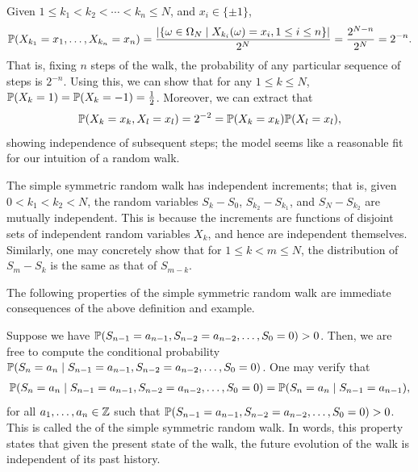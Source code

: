 Given $1 \leq k_{1} < k_{2} < \cdots < k_{n} \leq N$, and $x_{i} \in \{\pm 1\}$,
\begin{align}
    \mathbb{P}(X_{k_{1}} = x_{1}, \ldots, X_{k_{n}} = x_{n}) = \frac{\left| \{\omega \in \Omega_{N} \mid X_{k_{i}}(\omega) = x_{i}, 1 \leq i \leq n\} \right|}{2^{N}} = \frac{2^{N-n}}{2^{N}} = 2^{-n}.
\end{align}
That is, fixing $n$ steps of the walk, the probability of any particular sequence of steps is $2^{-n}$. Using this, we can show that for any $1 \leq k \leq N$, $\mathbb{P}(X_{k} = 1) = \mathbb{P}(X_{k} = -1) = \frac{1}{2}$. Moreover, we can extract that
\begin{align}
    \mathbb{P}(X_{k}=x_{k},X_{l}=x_{l}) = 2^{-2} = \mathbb{P}(X_{k}=x_{k})\mathbb{P}(X_{l}=x_{l}),
\end{align}
showing independence of subsequent steps; the model seems like a reasonable fit for our intuition of a random walk.

\begin{example}
    The simple symmetric random walk has independent increments; that is, given $0 < k_{1} < k_{2} < N$, the random variables $S_{k}-S_{0}$, $S_{k_{2}}-S_{k_{1}}$, and $S_{N}-S_{k_{2}}$ are mutually independent. This is because the increments are functions of disjoint sets of independent random variables $X_{k}$, and hence are independent themselves. Similarly, one may concretely show that for $1 \leq k < m \leq N$, the distribution of $S_{m}-S_{k}$ is the same as that of $S_{m-k}$.
\end{example}

The following properties of the simple symmetric random walk are immediate consequences of the above definition and example.

Suppose we have $\mathbb{P}(S_{n-1}=a_{n-1}, S_{n-2}=a_{n-2}, \ldots, S_{0}=0) > 0$. Then, we are free to compute the conditional probability $\mathbb{P}(S_{n}=a_{n} \mid S_{n-1}=a_{n-1}, S_{n-2}=a_{n-2}, \ldots, S_{0}=0)$. One may verify that
\begin{align}
    \mathbb{P}(S_{n}=a_{n} \mid S_{n-1}=a_{n-1}, S_{n-2}=a_{n-2}, \ldots, S_{0}=0) = \mathbb{P}(S_{n}=a_{n} \mid S_{n-1}=a_{n-1}),
\end{align}
for all $a_{1},\ldots,a_{n} \in \mathbb{Z}$ such that $\mathbb{P}(S_{n-1}=a_{n-1}, S_{n-2}=a_{n-2}, \ldots, S_{0}=0) > 0$. This is called the  of the simple symmetric random walk. In words, this property states that given the present state of the walk, the future evolution of the walk is independent of its past history.


